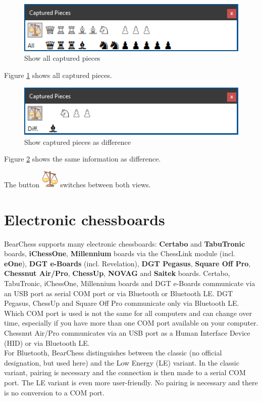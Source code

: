 \documentclass[11pt,a4paper]{article}
\begin{document}
\begin{figure}[H]
	\centering
	\includegraphics[scale=1.0]{CapturedPieces3.png}
	\caption{Show all captured pieces }
	\label{fig:CapturedPieces3}
\end{figure}

Figure \ref{fig:CapturedPieces3} shows all captured pieces.

\begin{figure}[H]
	\centering
	\includegraphics[scale=1.0]{CapturedPieces4.png}
	\caption{Show captured pieces as difference}
	\label{fig:CapturedPieces4}
\end{figure}
Figure \ref{fig:CapturedPieces4} shows the same information as difference.

The button \includegraphics[scale=0.5]{balance_unbalance.png} switches between both views.


\section{Electronic chessboards} \label{ElectronicChessBoard}
BearChess supports many electronic chessboards: \textbf{Certabo} and \textbf{TabuTronic}  boards, \textbf{iChessOne}, \textbf{Millennium} boards via the ChessLink module (incl. \textbf{eOne}), \textbf{DGT e-Boards} (incl. Revelation), \textbf{DGT Pegasus}, \textbf{Square Off Pro}, \textbf{Chessnut Air/Pro}, \textbf{ChessUp}, \textbf{NOVAG} and \textbf{Saitek} boards. Certabo, TabuTronic, iChessOne, Millennium boards and DGT e-Boards communicate via an USB port as serial COM port or via Bluetooth or Bluetooth LE. DGT Pegasus, ChessUp and Square Off Pro communicate only via Bluetooth LE. Which COM port is used is not the same for all computers and can change over time, especially if you have more than one COM port available on your computer. Chessnut Air/Pro communicates via an USB port as a Human Interface Device (HID) or via Bluetooth LE.\\ 
For Bluetooth, BearChess distinguishes between the classic (no official designation, but used here) and the Low Energy (LE) variant.
In the classic variant, pairing is necessary and the connection is then made to a serial COM port. The LE variant is even more user-friendly. No pairing is necessary and there is no conversion to a COM port.
\end{document}
